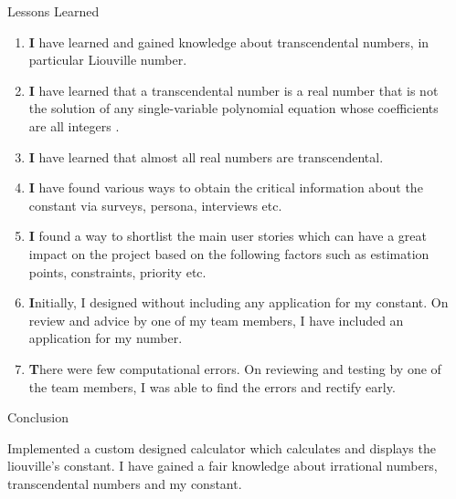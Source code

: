 \documentclass[final]{beamer}
\newlength{\sepwidth}
\newlength{\colwidth}
\newcommand{\separatorcolumn}{\begin{column}{\sepwidth}\end{column}}
\begin{document}
\begin{frame}[t]
\begin{columns}[t]
\begin{column}{\colwidth}
\begin{block}{Lessons Learned}
    \begin{enumerate}
      \item \textbf  I have learned and gained knowledge about transcendental numbers, in particular Liouville number. 
      \item \textbf I have learned that a transcendental number is a real number that is not the solution of any single-variable polynomial equation whose coefficients are all integers .
      \item \textbf I have learned that almost all real numbers are transcendental.
       \item \textbf I have found various ways to obtain the critical information about the constant via surveys, persona, interviews etc.
       \item \textbf I found a way to shortlist the main user stories which can have a great impact on the project based on the following factors such as estimation points, constraints, priority etc.
        \item \textbf Initially, I designed without including any application for my constant. On review and advice by one of my team members, I have included an application for my number.
        \item \textbf  There were few computational errors. On reviewing and testing by one of the team members, I was able to find the errors and rectify early.
    \end{enumerate}

  \end{block}
  \begin{alertblock}{Conclusion}

    Implemented a custom designed calculator which calculates and displays the liouville's constant. I have gained a fair knowledge about irrational numbers, transcendental numbers and my constant.

  \end{alertblock}

\end{column}

\separatorcolumn
\end{columns}
\end{frame}
\end{document}
